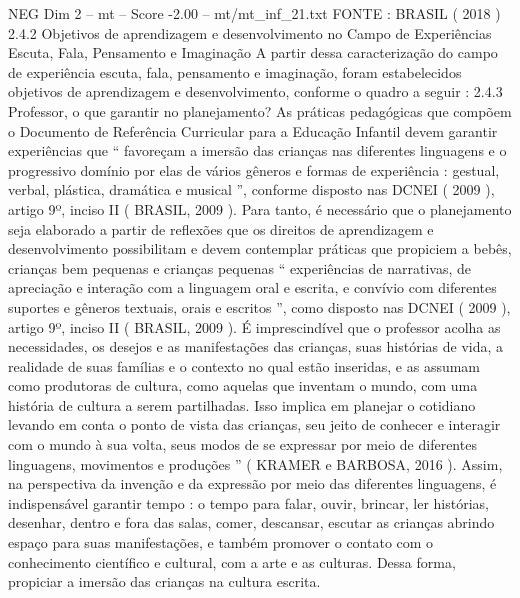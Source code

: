 \begin{textsample}{NEG Dim 2 – mt – Score -2.00 – mt/mt\_inf\_21.txt}
FONTE : BRASIL ( 2018 ) 2.4.2 Objetivos de aprendizagem e desenvolvimento no Campo de Experiências Escuta, Fala, Pensamento e Imaginação A partir dessa caracterização do campo de experiência escuta, fala, pensamento e imaginação, foram estabelecidos objetivos de aprendizagem e desenvolvimento, conforme o quadro a seguir : 2.4.3 Professor, o que garantir no planejamento?
As práticas pedagógicas que compõem o Documento de Referência Curricular para a Educação Infantil devem garantir experiências que “ favoreçam a imersão das crianças nas diferentes linguagens e o progressivo domínio por elas de vários gêneros e formas de experiência : gestual, verbal, plástica, dramática e musical ”, conforme disposto nas DCNEI ( 2009 ), artigo 9º, inciso II ( BRASIL, 2009 ).
Para tanto, é necessário que o planejamento seja elaborado a partir de reflexões que os direitos de aprendizagem e desenvolvimento possibilitam e devem contemplar práticas que propiciem a bebês, crianças bem pequenas e crianças pequenas “ experiências de narrativas, de apreciação e interação com a linguagem oral e escrita, e convívio com diferentes suportes e gêneros textuais, orais e escritos ”, como disposto nas DCNEI ( 2009 ), artigo 9º, inciso II ( BRASIL, 2009 ).
É imprescindível que o professor acolha as necessidades, os desejos e as manifestações das crianças, suas histórias de vida, a realidade de suas famílias e o contexto no qual estão inseridas, e as assumam como produtoras de cultura, como aquelas que inventam o mundo, com uma história de cultura a serem partilhadas.
Isso implica em planejar o cotidiano levando em conta o ponto de vista das crianças, seu jeito de conhecer e interagir com o mundo à sua volta, seus modos de se expressar por meio de diferentes linguagens, movimentos e produções ” ( KRAMER e BARBOSA, 2016 ).
Assim, na perspectiva da invenção e da expressão por meio das diferentes linguagens, é indispensável garantir tempo : o tempo para falar, ouvir, brincar, ler histórias, desenhar, dentro e fora das salas, comer, descansar, escutar as crianças abrindo espaço para suas manifestações, e também promover o contato com o conhecimento científico e cultural, com a arte e as culturas.
Dessa forma, propiciar a imersão das crianças na cultura escrita.

\end{textsample}
